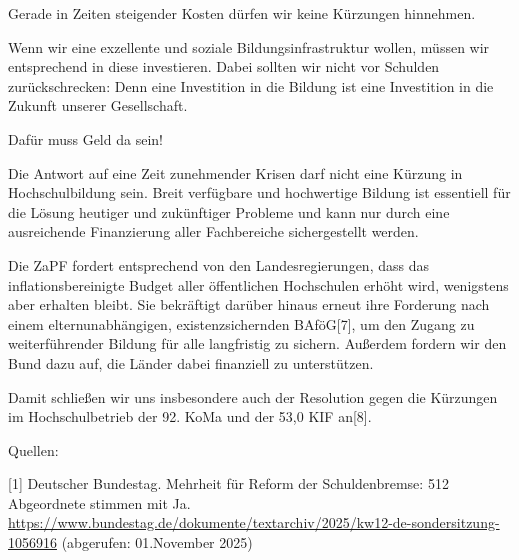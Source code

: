 \documentclass[DIV=calc]{scrartcl}
\let\oldgrqq=\grqq
\def\grqq{\oldgrqq\xspace}
\begin{document}
Gerade in Zeiten steigender Kosten dürfen wir keine Kürzungen hinnehmen.

Wenn wir eine exzellente und soziale Bildungsinfrastruktur wollen, müssen wir entsprechend in diese investieren. Dabei sollten wir nicht vor Schulden zurückschrecken: Denn eine Investition in die Bildung ist eine Investition in die Zukunft unserer Gesellschaft.

Dafür muss Geld da sein!

Die Antwort auf eine Zeit zunehmender Krisen darf nicht eine Kürzung in Hochschulbildung sein. Breit verfügbare und hochwertige Bildung ist essentiell für die Lösung heutiger und zukünftiger Probleme und kann nur durch eine ausreichende Finanzierung aller Fachbereiche sichergestellt werden.

Die ZaPF fordert entsprechend von den Landesregierungen, dass das inflationsbereinigte Budget aller öffentlichen Hochschulen erhöht wird, wenigstens aber erhalten bleibt. Sie bekräftigt darüber hinaus erneut ihre Forderung nach einem elternunabhängigen, existenzsichernden BAföG[7], um den Zugang zu weiterführender Bildung für alle langfristig zu sichern. Außerdem fordern wir den Bund dazu auf, die Länder dabei finanziell zu unterstützen.

Damit schließen wir uns insbesondere auch der Resolution gegen die Kürzungen im Hochschulbetrieb der 92. KoMa und der 53,0 KIF an[8].

Quellen:

[1] Deutscher Bundestag. \glqq Mehrheit für Reform der Schuldenbremse: 512 Abgeordnete stimmen mit Ja. \grqq  \url{https://www.bundestag.de/dokumente/textarchiv/2025/kw12-de-sondersitzung-1056916} (abgerufen: 01.November 2025)
\end{document}
